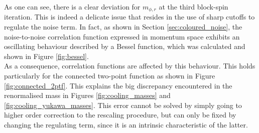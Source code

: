 As one can see, there is a clear deviation for $m_{\phi, r}$ at the third block-spin iteration.
This is indeed a delicate issue that resides in the use of sharp cutoffs to regulate the noise term. In fact, as shown in Section \ref{sec:coloured_noise}, the noise-to-noise correlation function expressed in momentum space exhibits an oscillating behaviour described by a Bessel function, which was calculated and shown in Figure \ref{fig:bessel}. \\
As a consequence, correlation functions are affected by this behaviour. This holds particularly for the connected two-point function as shown in Figure \ref{fig:connected_2ptf}. This explains the big discrepancy encountered in the renormalised mass in Figures \ref{fig:cooling_masses} and \ref{fig:cooling_yukawa_masses}. This error cannot be solved
by simply going to higher order correction to the rescaling procedure, but can only be fixed by changing the regulating term, since it is an intrinsic characteristic of the latter.
